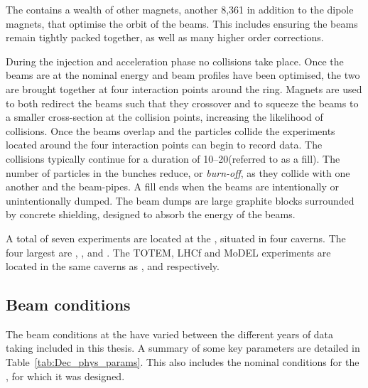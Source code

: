 The \lhc contains a wealth of other magnets, another 8,361 in addition to the dipole magnets, that optimise the orbit of the beams. This includes ensuring the beams remain tightly packed together, as well as many higher order corrections.   

During the injection and acceleration phase no collisions take place. Once the beams are at the nominal energy and beam profiles have been optimised, the two are brought together at four interaction points around the ring. Magnets are used to both redirect the beams such that they crossover and to squeeze the beams to a smaller cross-section at the collision points, increasing the likelihood of collisions. Once the beams overlap and the particles collide the experiments located around the four interaction points can begin to record data. The collisions typically continue for a duration of 10--20\hr (referred to as a fill). The number of particles in the bunches reduce, or \emph{burn-off}, as they collide with one another and the beam-pipes. A fill ends when the beams are intentionally or unintentionally dumped. The beam dumps are large graphite blocks surrounded by concrete shielding, designed to absorb the energy of the beams.  

A total of seven experiments are located at the \lhc, situated in four caverns. The four largest are \atlas, \cms, \lhcb and \alice. The TOTEM, LHCf and MoDEL experiments are located in the same caverns as \cms, \atlas and \lhcb respectively. 





\subsection{Beam conditions}
The beam conditions at the \lhc have varied between the different years of data taking included in this thesis. A summary of some key parameters are detailed in Table~\ref{tab:Dec_phys_params}. This also includes the nominal conditions for the \lhc, for which it was designed. 


